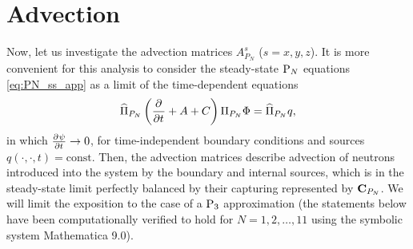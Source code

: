 \section{Advection}\label{sec:app-adv}
Now, let us investigate the advection matrices $A_{P_N}^s$ ($s = x,y,z$). It is more
convenient for this analysis to consider the steady-state $\PN$ equations \eqref{eq:PN_ss_app} as a limit of the 
time-dependent equations
\begin{equation}\label{eq:PN_ss_app}
	\PihPN \left(\pd{}{t} + A + C\right) \PiPN\Phi = \PihPN q,
\end{equation}
in which $\pd{\psi}{t} \to 0$, for time-independent boundary conditions and sources \linebreak[4]\mbox{$q(\cdot,\cdot,t)
= \text{const}$}.
Then, the advection matrices describe advection of neutrons introduced into the system by the boundary and internal
sources, which is in the steady-state limit perfectly balanced by their capturing represented by $\mat{C}_{P_N}$. We
will limit the exposition to the case of a $\PN[3]$ approximation (the statements below have been computationally
verified to hold for $N = 1,2,\ldots,11$ using the symbolic system Mathematica 9.0).
\newpage


